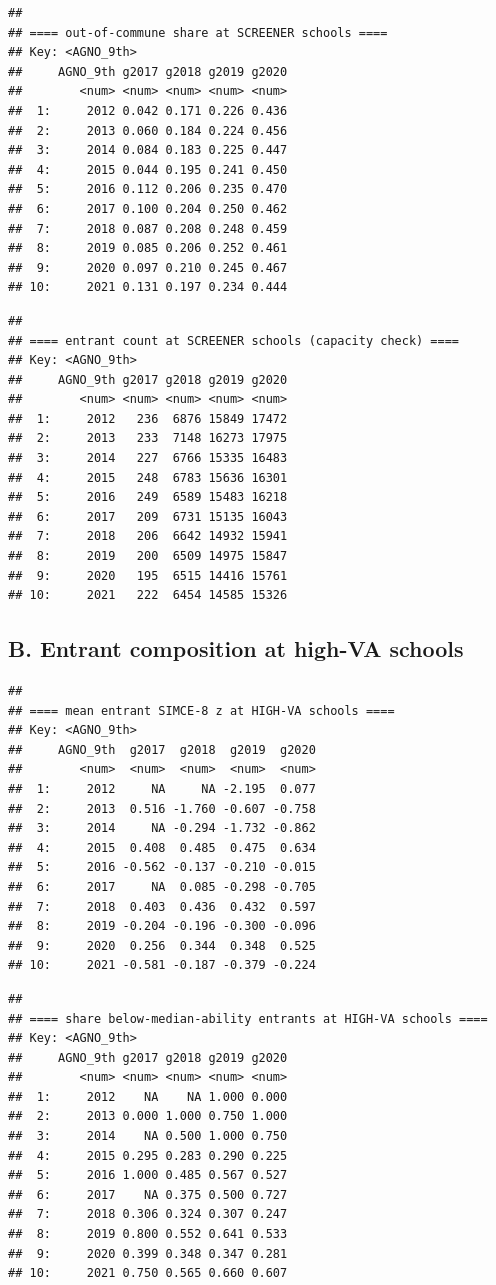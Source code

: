 \documentclass[
]{article}
\begin{document}
\begin{verbatim}
## 
## ==== out-of-commune share at SCREENER schools ====
## Key: <AGNO_9th>
##     AGNO_9th g2017 g2018 g2019 g2020
##        <num> <num> <num> <num> <num>
##  1:     2012 0.042 0.171 0.226 0.436
##  2:     2013 0.060 0.184 0.224 0.456
##  3:     2014 0.084 0.183 0.225 0.447
##  4:     2015 0.044 0.195 0.241 0.450
##  5:     2016 0.112 0.206 0.235 0.470
##  6:     2017 0.100 0.204 0.250 0.462
##  7:     2018 0.087 0.208 0.248 0.459
##  8:     2019 0.085 0.206 0.252 0.461
##  9:     2020 0.097 0.210 0.245 0.467
## 10:     2021 0.131 0.197 0.234 0.444
\end{verbatim}

\begin{verbatim}
## 
## ==== entrant count at SCREENER schools (capacity check) ====
## Key: <AGNO_9th>
##     AGNO_9th g2017 g2018 g2019 g2020
##        <num> <num> <num> <num> <num>
##  1:     2012   236  6876 15849 17472
##  2:     2013   233  7148 16273 17975
##  3:     2014   227  6766 15335 16483
##  4:     2015   248  6783 15636 16301
##  5:     2016   249  6589 15483 16218
##  6:     2017   209  6731 15135 16043
##  7:     2018   206  6642 14932 15941
##  8:     2019   200  6509 14975 15847
##  9:     2020   195  6515 14416 15761
## 10:     2021   222  6454 14585 15326
\end{verbatim}

\hypertarget{b.-entrant-composition-at-high-va-schools}{%
\subsection{B. Entrant composition at high-VA
schools}\label{b.-entrant-composition-at-high-va-schools}}

\begin{verbatim}
## 
## ==== mean entrant SIMCE-8 z at HIGH-VA schools ====
## Key: <AGNO_9th>
##     AGNO_9th  g2017  g2018  g2019  g2020
##        <num>  <num>  <num>  <num>  <num>
##  1:     2012     NA     NA -2.195  0.077
##  2:     2013  0.516 -1.760 -0.607 -0.758
##  3:     2014     NA -0.294 -1.732 -0.862
##  4:     2015  0.408  0.485  0.475  0.634
##  5:     2016 -0.562 -0.137 -0.210 -0.015
##  6:     2017     NA  0.085 -0.298 -0.705
##  7:     2018  0.403  0.436  0.432  0.597
##  8:     2019 -0.204 -0.196 -0.300 -0.096
##  9:     2020  0.256  0.344  0.348  0.525
## 10:     2021 -0.581 -0.187 -0.379 -0.224
\end{verbatim}

\begin{verbatim}
## 
## ==== share below-median-ability entrants at HIGH-VA schools ====
## Key: <AGNO_9th>
##     AGNO_9th g2017 g2018 g2019 g2020
##        <num> <num> <num> <num> <num>
##  1:     2012    NA    NA 1.000 0.000
##  2:     2013 0.000 1.000 0.750 1.000
##  3:     2014    NA 0.500 1.000 0.750
##  4:     2015 0.295 0.283 0.290 0.225
##  5:     2016 1.000 0.485 0.567 0.527
##  6:     2017    NA 0.375 0.500 0.727
##  7:     2018 0.306 0.324 0.307 0.247
##  8:     2019 0.800 0.552 0.641 0.533
##  9:     2020 0.399 0.348 0.347 0.281
## 10:     2021 0.750 0.565 0.660 0.607
\end{verbatim}
\end{document}
